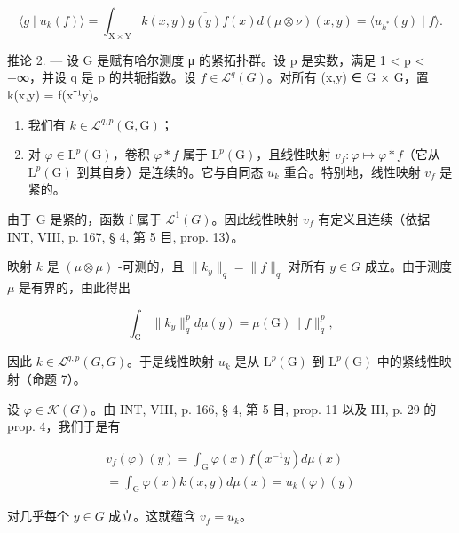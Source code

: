 \[
\langle g \mid u _ {k} (f) \rangle = \int_ {\mathrm{X} \times \mathrm{Y}} k (x, y) \overline {{g (y)}} f (x) d (\mu \otimes \nu) (x, y) = \langle u _ {k ^ {*}} (g) \mid f \rangle .
\]

推论 2. --- 设 G 是赋有哈尔测度 μ 的紧拓扑群。设 p 是实数，满足 1 \textless{} p \textless{} +∞，并设 q 是 p 的共轭指数。设 \(f \in \mathcal{L}^{q}(G)\)。对所有 (x,y) ∈ G × G，置 k(x,y) = f(x⁻¹y)。

\begin{enumerate}
\def\labelenumi{\alph{enumi})}
\item
  我们有 \(k \in \mathcal{L}^{q,p}(\mathrm{G},\mathrm{G})\)；
\item
  对 \(\varphi \in \mathrm{L}^p (\mathrm{G})\)，卷积 \(\varphi *f\) 属于 \(\mathrm{L}^p (\mathrm{G})\)，且线性映射 \(v_{f}\colon \varphi \mapsto \varphi *f\)（它从 \(\mathrm{L}^p (\mathrm{G})\) 到其自身）是连续的。它与自同态 \(u_{k}\) 重合。特别地，线性映射 \(v_{f}\) 是紧的。
\end{enumerate}

由于 G 是紧的，函数 f 属于 \(\mathcal{L}^{1}(G)\)。因此线性映射 \(v_{f}\) 有定义且连续（依据 INT, VIII, p. 167, § 4, 第 5 目, prop. 13）。

映射 \(k\) 是 \((\mu \otimes \mu)\) -可测的，且 \(\| k_y\| _q = \| f\| _q\) 对所有 \(y\in G\) 成立。由于测度 \(\mu\) 是有界的，由此得出

\[
\int_ {\mathrm{G}} \| k _ {y} \| _ {q} ^ {p} d \mu (y) = \mu (\mathrm{G}) \| f \| _ {q} ^ {p},
\]

因此 \(k \in \mathcal{L}^{q,p}(G, G)\)。于是线性映射 \(u_{k}\) 是从 \(\mathrm{L}^{p}(\mathrm{G})\) 到 \(\mathrm{L}^{p}(\mathrm{G})\) 中的紧线性映射（命题 7）。

设 \(\varphi\in\mathcal{K}(G)\)。由 INT, VIII, p. 166, § 4, 第 5 目, prop. 11 以及 III, p. 29 的 prop. 4，我们于是有

\[
\begin{array}{c} v _ {f} (\varphi) (y) = \int_ {\mathrm{G}} \varphi (x) f (x ^ {- 1} y) d \mu (x) \\ = \int_ {\mathrm{G}} \varphi (x) k (x, y) d \mu (x) = u _ {k} (\varphi) (y) \end{array}
\]

对几乎每个 \(y \in G\) 成立。这就蕴含 \(v_{f} = u_{k}\)。

